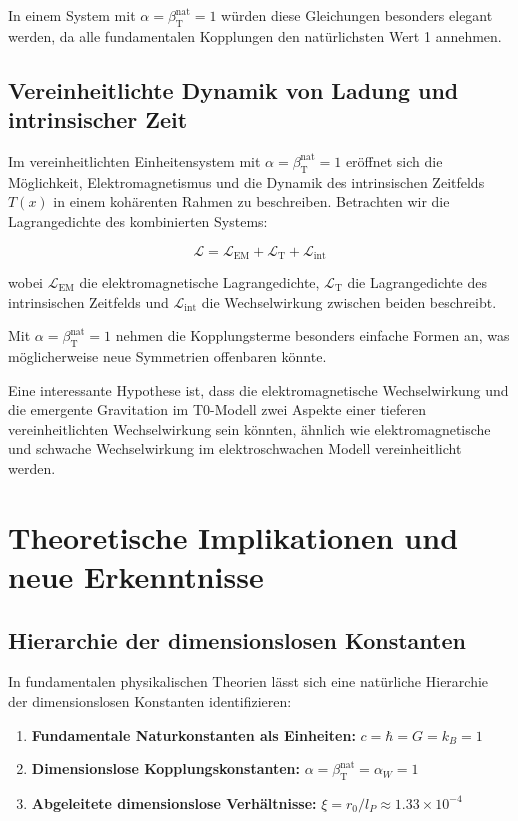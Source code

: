 \documentclass[12pt,a4paper]{article}
\newcommand{\Tfield}{T(x)}
\newcommand{\betaT}{\beta_{\text{T}}}
\begin{document}
	In einem System mit \(\alpha = \betaT^{\text{nat}} = 1\) würden diese Gleichungen besonders elegant werden, da alle fundamentalen Kopplungen den natürlichsten Wert 1 annehmen.
	
	\subsection{Vereinheitlichte Dynamik von Ladung und intrinsischer Zeit}
	
	Im vereinheitlichten Einheitensystem mit \(\alpha = \betaT^{\text{nat}} = 1\) eröffnet sich die Möglichkeit, Elektromagnetismus und die Dynamik des intrinsischen Zeitfelds \(\Tfield\) in einem kohärenten Rahmen zu beschreiben. Betrachten wir die Lagrangedichte des kombinierten Systems:
	
	\begin{equation}
		\mathcal{L} = \mathcal{L}_{\text{EM}} + \mathcal{L}_{\text{T}} + \mathcal{L}_{\text{int}}
	\end{equation}
	
	wobei \(\mathcal{L}_{\text{EM}}\) die elektromagnetische Lagrangedichte, \(\mathcal{L}_{\text{T}}\) die Lagrangedichte des intrinsischen Zeitfelds und \(\mathcal{L}_{\text{int}}\) die Wechselwirkung zwischen beiden beschreibt.
	
	Mit \(\alpha = \betaT^{\text{nat}} = 1\) nehmen die Kopplungsterme besonders einfache Formen an, was möglicherweise neue Symmetrien offenbaren könnte.
	
	Eine interessante Hypothese ist, dass die elektromagnetische Wechselwirkung und die emergente Gravitation im T0-Modell zwei Aspekte einer tieferen vereinheitlichten Wechselwirkung sein könnten, ähnlich wie elektromagnetische und schwache Wechselwirkung im elektroschwachen Modell vereinheitlicht werden.
	
	\section{Theoretische Implikationen und neue Erkenntnisse}
	
	\subsection{Hierarchie der dimensionslosen Konstanten}
	
	In fundamentalen physikalischen Theorien lässt sich eine natürliche Hierarchie der dimensionslosen Konstanten identifizieren:
	
	\begin{enumerate}[label=\arabic*.]
		\item \textbf{Fundamentale Naturkonstanten als Einheiten:} \(c = \hbar = G = k_B = 1\)
		\item \textbf{Dimensionslose Kopplungskonstanten:} \(\alpha = \betaT^{\text{nat}} = \alpha_W = 1\)
		\item \textbf{Abgeleitete dimensionslose Verhältnisse:} \(\xi = r_0/l_P \approx 1.33 \times 10^{-4}\)
	\end{enumerate}
	
\end{document}
